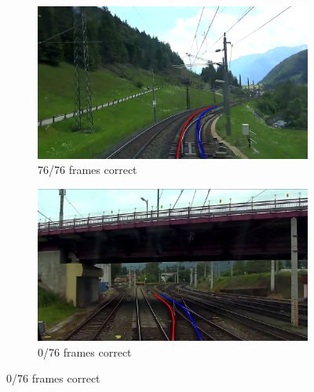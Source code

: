 \begin{figure}[H]
    \centering
    \begin{subfigure}[b]{0.48\textwidth}
        \centering
        \includegraphics[width=\textwidth]{PICs/experiments/temporalModels/allesRichtig.png}
        \caption{76/76 frames correct}
        \label{fig:temporalTestSet_a}
    \end{subfigure}
    \hfill
    \begin{subfigure}[b]{0.48\textwidth}
        \centering
        \includegraphics[width=\textwidth]{PICs/experiments/temporalModels/allesFalsch.png}
        \caption{0/76 frames correct}
    \end{subfigure}
    
    \vspace{0.5cm} %


\end{figure}
